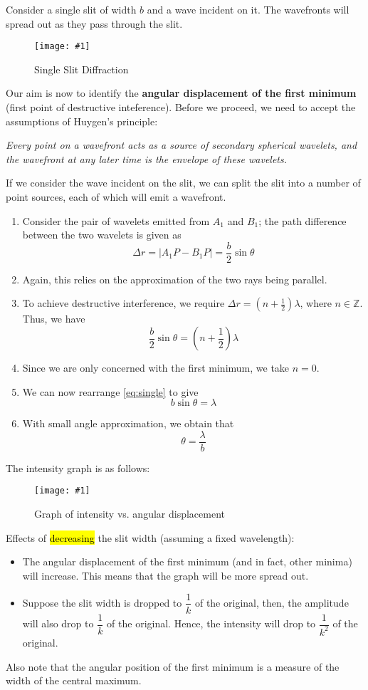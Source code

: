 \documentclass[a4paper,12pt]{article}
\newcommand{\img}[4]{\begin{center}
  \begin{figure}[H]
    \centering
    \texttt{[image: \#1]}
    \caption{#3}
    \label{fig:#4}
  \end{figure}
\end{center}}
\begin{document}
Consider a single slit of width $b$ and a wave incident on it. The wavefronts will spread out as they pass through the slit.
\img{singleslit.png}{0.5}{Single Slit Diffraction}{singleslit}
Our aim is now to identify the \textbf{angular displacement of the first minimum} (first point of destructive inteference). Before we proceed, we need to accept the assumptions of Huygen's principle:
\begin{center}
  \textit{Every point on a wavefront acts as a source of secondary spherical wavelets, and the wavefront at any later time is the envelope of these wavelets.}
\end{center}
If we consider the wave incident on the slit, we can split the slit into a number of point sources, each of which will emit a wavefront.
\pagebreak
\begin{enumerate}
  \item Consider the pair of wavelets emitted from $A_1$ and $B_1$; the path difference between the two wavelets is given as
        $$\Delta r = |A_1P - B_1P| = \frac{b}{2}\sin\theta$$
  \item Again, this relies on the approximation of the two rays being parallel.
  \item To achieve destructive interference, we require $\Delta r = (n + \frac{1}{2})\lambda$, where $n \in \mathbb{Z}$. Thus, we have
        \begin{equation}\label{eq:single}
          \frac{b}{2}\sin\theta = (n + \frac{1}{2})\lambda
        \end{equation}
  \item Since we are only concerned with the first minimum, we take $n = 0$.
  \item We can now rearrange \cref{eq:single} to give
        \begin{equation}\label{eq:single2}
          b\sin\theta = \lambda
        \end{equation}
  \item With small angle approximation, we obtain that
        \begin{equation}\label{eq:single_final}
          \theta = \frac{\lambda}{b}
        \end{equation}
\end{enumerate}

The intensity graph is as follows:
\img{singleslitintensity.png}{0.4}{Graph of intensity vs. angular displacement}{singleslitintensity}
Effects of \hl{decreasing} the slit width (assuming a fixed wavelength):
\begin{itemize}
  \item The angular displacement of the first minimum (and in fact, other minima) will increase. This means that the graph will be more spread out.
  \item Suppose the slit width is dropped to $\dfrac{1}{k}$ of the original, then, the amplitude will also drop to $\dfrac{1}{k}$ of the original. Hence, the intensity will drop to $\dfrac{1}{k^2}$ of the original.
\end{itemize}
Also note that the angular position of the first minimum is a measure of the width of the central maximum.
\end{document}
